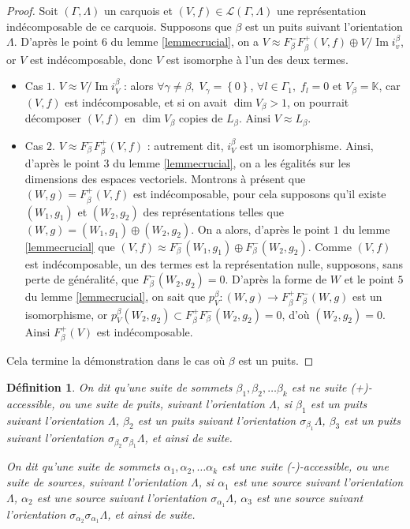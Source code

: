 \documentclass[a4paper,10pt]{article}
\newtheorem{defi}[]{Définition}[section]
\DeclareMathOperator{\Img}{Im}
\begin{document}
\begin{proof}
	Soit $(\Gamma,\Lambda)$ un carquois et $(V,f)\in\mathscr L(\Gamma,\Lambda)$ une représentation indécomposable de ce carquois. Supposons que $\beta$ est un puits suivant l'orientation $\Lambda$. D'après le point $6$ du lemme \ref{lemmecrucial}, on a $V\approx F_\beta^-F_\beta^+(V,f)\oplus V/\Img i_v^\beta$, or $V$ est indécomposable, donc $V$ est isomorphe à l'un des deux termes.
	\begin{itemize}
		\item Cas $1$. $V\approx V/\Img i_V^\beta$ : alors $\forall \gamma\neq\beta,\;V_\gamma=\left\{ 0 \right\}$, $\forall l\in\Gamma_1,\;f_l=0$ et $V_\beta=\mathbb K$, car $(V,f)$ est indécomposable, et si on avait $\dim V_\beta>1$, on pourrait décomposer $(V,f)$ en $\dim V_\beta$ copies de $L_\beta$. Ainsi $V\approx L_\beta$.
		\item Cas $2$. $V\approx F_\beta^-F_\beta^+(V,f)$ : autrement dit, $i_V^\beta$ est un isomorphisme. Ainsi, d'après le point $3$ du lemme \ref{lemmecrucial}, on a les égalités sur les dimensions des espaces vectoriels. Montrons à présent que $(W,g)=F_\beta^+(V,f)$ est indécomposable, pour cela supposons qu'il existe $(W_1,g_1)$ et $(W_2,g_2)$ des représentations telles que $(W,g)=(W_1,g_1)\oplus(W_2,g_2)$. On a alors, d'après le point $1$ du lemme \ref{lemmecrucial} que $(V,f)\approx F_\beta^-(W_1,g_1)\oplus F_\beta^-(W_2,g_2)$. Comme $(V,f)$ est indécomposable, un des termes est la représentation nulle, supposons, sans perte de généralité, que $F_\beta^-(W_2,g_2)=0$. D'après la forme de $W$ et le point $5$ du lemme \ref{lemmecrucial}, on sait que $p_V^\beta:(W,g)\rightarrow F_\beta^+F_\beta^-(W,g)$ est un isomorphisme, or $p_V^\beta(W_2,g_2)\subset F_\beta^+F_\beta^-(W_2,g_2)=0$, d'où $(W_2,g_2)=0$. Ainsi $F_\beta^+(V)$ est indécomposable. 
	\end{itemize}
Cela termine la démonstration dans le cas où $\beta$ est un puits.
\end{proof}
\begin{defi}
	On dit qu'une suite de sommets $\beta_1,\beta_2,\dots\beta_k$ est ne suite (+)-accessible, ou une \emph{suite de puits}, suivant l'orientation $\Lambda$, si $\beta_1$ est un puits suivant l'orientation $\Lambda$, $\beta_2$ est un puits suivant l'orientation $\sigma_{\beta_1}\Lambda$, $\beta_3$ est un puits suivant l'orientation $\sigma_{\beta_2}\sigma_{\beta_1}\Lambda$, et ainsi de suite.

	On dit qu'une suite de sommets $\alpha_1,\alpha_2,\dots\alpha_k$ est une suite (-)-accessible, ou une suite de sources, suivant l'orientation $\Lambda$, si $\alpha_1$ est une source suivant l'orientation $\Lambda$, $\alpha_2$ est une source suivant l'orientation $\sigma_{\alpha_1}\Lambda$, $\alpha_3$ est une source suivant l'orientation $\sigma_{\alpha_2}\sigma_{\alpha_1}\Lambda$, et ainsi de suite.
\end{defi}
\end{document}
